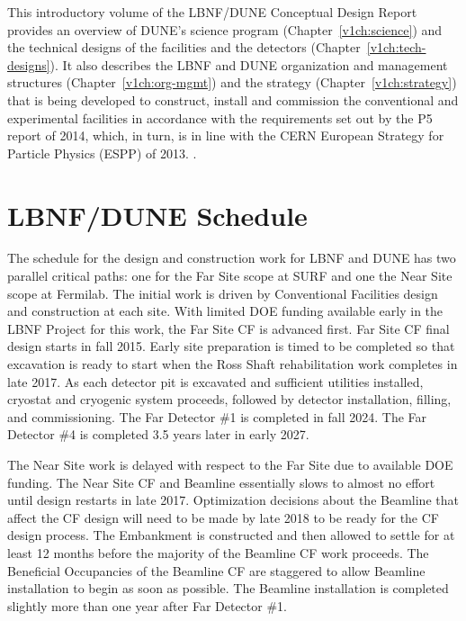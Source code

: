 This introductory volume of the LBNF/DUNE Conceptual Design Report provides an overview of DUNE's science program (Chapter~\ref{v1ch:science}) and the technical designs of the facilities and the detectors 
(Chapter~\ref{v1ch:tech-designs}). It also describes the LBNF and DUNE organization and management structures 
(Chapter~\ref{v1ch:org-mgmt}) and the strategy (Chapter~\ref{v1ch:strategy})  that is being developed to construct, install and commission the conventional and experimental facilities in accordance with the requirements set out by the P5 report of 2014, which, in turn, is in line with the CERN
European Strategy for Particle Physics (ESPP) of 2013. .

\section{LBNF/DUNE Schedule}


The schedule for the design and construction work for LBNF and DUNE has two parallel critical paths: one for the Far Site scope at SURF and one the Near Site scope at Fermilab. The initial work is driven by Conventional Facilities design and construction at each site. With limited DOE funding available early in the LBNF Project for this work, the Far Site CF is advanced first. Far Site CF final design starts in fall 2015. Early site preparation is timed to be completed so that excavation is ready to start when the Ross Shaft rehabilitation work completes in late 2017. As each detector pit is excavated and sufficient utilities installed, cryostat and cryogenic system proceeds, followed by detector installation, filling, and commissioning. The Far Detector \#1 is completed in fall 2024. The Far Detector \#4 is completed 3.5 years later in early 2027. 

The Near Site work is delayed with respect to the Far Site due to available DOE funding. The Near Site CF and Beamline essentially slows to almost no effort until design restarts in late 2017. Optimization decisions about the Beamline that affect the CF design will need to be made by late 2018 to be ready for the CF design process. The Embankment is constructed and then allowed to settle for at least 12 months before the majority of the Beamline CF work proceeds. The Beneficial Occupancies of the Beamline CF are staggered to allow Beamline installation to begin as soon as possible. The Beamline installation is completed slightly more than one year after Far Detector \#1. 


